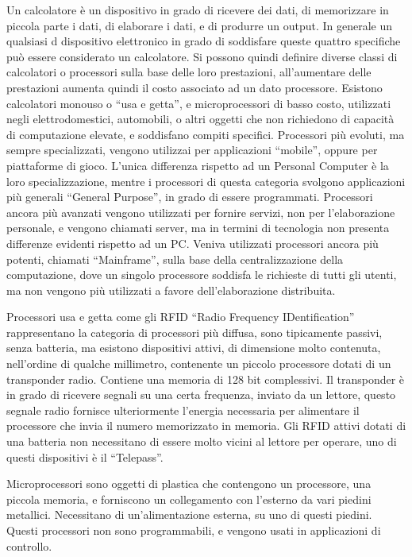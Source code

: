 \documentclass{article}
\numberwithin{equation}{subsection}
\begin{document}
Un calcolatore è un dispositivo in grado di ricevere dei dati, di memorizzare in piccola parte i dati, di elaborare i dati, e di produrre un output. In generale un qualsiasi d
dispositivo elettronico in grado di soddisfare queste quattro specifiche può essere considerato un calcolatore. 
Si possono quindi definire diverse classi di calcolatori o processori sulla base delle loro prestazioni, all'aumentare delle prestazioni aumenta quindi il costo associato ad 
un dato processore. Esistono calcolatori monouso o ``usa e getta'', e microprocessori di basso costo, utilizzati negli elettrodomestici, automobili, o altri oggetti che non richiedono di capacità 
di computazione elevate, e soddisfano compiti specifici. Processori più evoluti, ma sempre specializzati, vengono utilizzai per applicazioni ``mobile'', oppure per piattaforme 
di gioco. L'unica differenza rispetto ad un Personal Computer è la loro specializzazione, mentre i processori di questa categoria svolgono applicazioni più generali 
``General Purpose'', in grado di essere programmati. Processori ancora più avanzati vengono utilizzati per fornire servizi, non per l'elaborazione personale, e vengono chiamati 
server, ma in termini di tecnologia non presenta differenze evidenti rispetto ad un PC. Veniva utilizzati processori ancora più potenti, chiamati ``Mainframe'', sulla base della 
centralizzazione della computazione, dove un singolo processore soddisfa le richieste di tutti gli utenti, ma non vengono più utilizzati a favore dell'elaborazione 
distribuita. 


Processori usa e getta come gli RFID ``Radio Frequency IDentification'' rappresentano la categoria di processori più diffusa, sono tipicamente passivi, senza batteria, ma esistono 
dispositivi attivi, di dimensione 
molto contenuta, nell'ordine di qualche millimetro, contenente un piccolo processore dotati di un transponder radio. Contiene una memoria di 128 bit complessivi. Il transponder 
è in grado di ricevere segnali su una certa frequenza, inviato da un lettore, questo segnale radio fornisce ulteriormente l'energia necessaria per alimentare il processore 
che invia il numero memorizzato in memoria. 
Gli RFID attivi dotati di una batteria non necessitano di essere molto vicini al lettore per operare, uno di questi dispositivi è il ``Telepass''. 


Microprocessori sono oggetti di plastica che contengono un processore, una piccola memoria, e forniscono un collegamento con l'esterno da vari piedini metallici. Necessitano di 
un'alimentazione esterna, su uno di questi piedini. Questi processori non sono programmabili, e vengono usati in applicazioni di controllo. 
\end{document}
